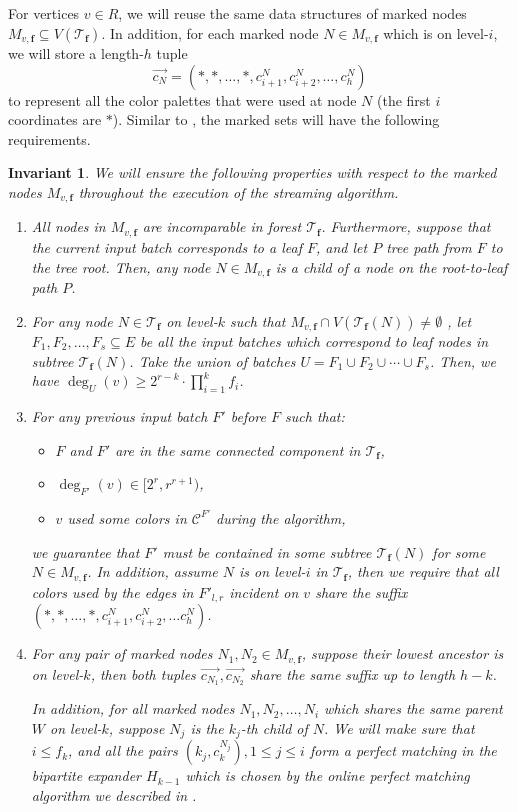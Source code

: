 \documentclass[11pt,a4paper]{article}
\newtheorem{invariant}{Invariant}[section]
\newcommand{\tree}{\mathcal{T}}
\newcommand{\freq}{\mathbf{f}}
\newcommand{\clr}{\mathcal{C}}
\begin{document}
For vertices $v\in R$, we will reuse the same data structures of marked nodes $M_{v, \freq}\subseteq V(\tree_\freq)$. In addition, for each marked node $N\in M_{v, \freq}$ which is on level-$i$, we will store a length-$h$ tuple $$\overrightarrow{c_N} = (*, *, \ldots, *, c^N_{i+1}, c^N_{i+2}, \ldots, c^N_h)$$ to represent all the color palettes that were used at node $N$ (the first $i$ coordinates are $*$). Similar to , the marked sets will have the following requirements.
\begin{invariant}\label{det-inv}
	We will ensure the following properties with respect to the marked nodes $M_{v, \freq}$ throughout the execution of the streaming algorithm.
	\begin{enumerate}[(1)]
		\item All nodes in $M_{v, \freq}$ are incomparable in forest $\tree_{\freq}$. Furthermore, suppose that the current input batch corresponds to a leaf $F$, and let $P$ tree path from $F$ to the tree root. Then, any node $N\in M_{v, \freq}$ is a child of a node on the root-to-leaf path $P$.
		
		\item For any node $N\in \tree_\freq$ on level-$k$ such that $M_{v, \freq}\cap V(\tree_\freq(N))\neq \emptyset$ , let $F_1, F_2, \ldots, F_s\subseteq E$ be all the input batches which correspond to leaf nodes in subtree $\tree_\freq(N)$. Take the union of batches $U = F_1\cup F_2\cup\cdots \cup F_s$. Then, we have $\deg_U(v)\geq 2^{r-k}\cdot\prod_{i = 1}^k f_i$.
		
		\item For any previous input batch $F'$ before $F$ such that:
		\begin{itemize}
			\item $F$ and $F'$ are in the same connected component in $\tree_\freq$,
			\item $\deg_{F'}(v)\in [2^r, r^{r+1})$,
			\item $v$ used some colors in $\clr^{F'}$ during the algorithm,
		\end{itemize} 
		we guarantee that $F'$ must be contained in some subtree $\tree_{\freq}(N)$ for some $N\in M_{v, \freq}$. In addition, assume $N$ is on level-$i$ in $\tree_\freq$, then we require that all colors used by the edges in $F'_{l, r}$ incident on $v$ share the suffix $\left(*, *, \ldots, *, c^N_{i+1}, c^N_{i+2}, \ldots c^N_h\right)$.
		
		\item For any pair of marked nodes $N_1, N_2\in M_{v, \freq}$, suppose their lowest ancestor is on level-$k$, then both tuples $\overrightarrow{c_{N_1}}, \overrightarrow{c_{N_2}}$ share the same suffix up to length $h-k$.
		
		In addition, for all marked nodes $N_1, N_2, \ldots, N_i$ which shares the same parent $W$ on level-$k$, suppose $N_j$ is the $k_j$-th child of $N$. We will make sure that $i\leq f_k$, and all the pairs $\left(k_j, c_{k}^{N_j}\right), 1\leq j\leq i$ form a perfect matching in the bipartite expander $H_{k-1}$ which is chosen by the online perfect matching algorithm we described in .
	\end{enumerate}
\end{invariant}
\end{document}

